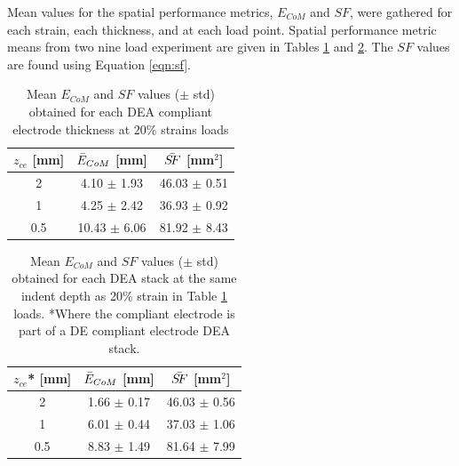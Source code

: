 Mean values for the spatial performance metrics, $E_{CoM}$ and $S\!F$, were gathered for each strain, each thickness, and at each load point. Spatial performance metric means from two nine load experiment are given in Tables \ref{tab:spatial_metrics_ce} and \ref{tab:spatial_metrics_dea}. The $S\!F$ values are found using Equation \ref{eqn:sf}.

\begin{table}[H]
	\centering
	\caption{Mean $E_{CoM}$ and $S\!F$ values ($\pm$ std) obtained for each DEA compliant electrode thickness at 20\% strains loads}
	\label{tab:spatial_metrics_ce}
	\begin{tabular}{c|c|c}
		$z_{ce}$ [mm] & $\Bar{E}_{CoM}$ [mm] & $\Bar{S\!F}$ [mm$^2$] \\
		\hline
		2 & 4.10 $\pm$ 1.93 & 46.03 $\pm$ 0.51\\ %
		1 & 4.25 $\pm$ 2.42 & 36.93 $\pm$ 0.92\\
		0.5 & 10.43 $\pm$ 6.06 & 81.92 $\pm$ 8.43\\
	\end{tabular}
\end{table}

\begin{table}[H]
	\centering
	\caption{Mean $E_{CoM}$ and $S\!F$ values ($\pm$ std) obtained for each DEA stack at the same indent depth as 20\% strain in Table \ref{tab:spatial_metrics_ce} loads. *Where the compliant electrode is part of a DE compliant electrode DEA stack.}
	\label{tab:spatial_metrics_dea}
	\begin{tabular}{c|c|c}
		$z_{ce}$* [mm] & $\Bar{E}_{CoM}$ [mm] & $\Bar{S\!F}$ [mm$^2$] \\
		\hline
		2 & 1.66 $\pm$ 0.17 & 46.03 $\pm$ 0.56\\ %
		1 & 6.01 $\pm$ 0.44 & 37.03 $\pm$ 1.06\\ 
		0.5 & 8.83 $\pm$ 1.49 & 81.64 $\pm$ 7.99\\ %
	\end{tabular}
\end{table}

